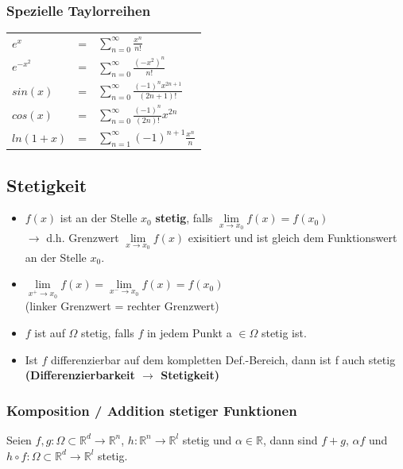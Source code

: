 \documentclass[6pt]{article}
\begin{document}
\begin{multicols*}{3}
\subsubsection*{Spezielle Taylorreihen}
\vspace{-2mm} 
	\begin{doublespace} 
		\begin{tabular}{lll}
			$e^x$  		& = & $\sum_{n=0}^\infty \frac{x^n}{n!}$ \\
			$e^{-x^2}$ & = & $\sum_{n=0}^\infty \frac{(-x^2)^n}{n!}$ \\
			$sin(x)$ 	& = & $\sum_{n=0}^\infty \frac{(-1)^n x^{2n+1}}{(2n+1)!}$\\
			$cos(x)$ 	& = & $\sum_{n=0}^{\infty} \frac{(-1)^n}{(2n)!} x^{2n}$\\
			$ln(1+x)$ & = & $\sum_{n=1}^{\infty} (-1)^{n+1}\frac{x^n}n$ \\
		\end{tabular}
	\end{doublespace}

\pagebreak

\subsection*{Stetigkeit}

\begin{itemize}[itemsep=2pt, parsep=3pt, leftmargin=*,align=left]
	\item 	$f(x)$ ist an der Stelle $x_0$ {\bf stetig}, falls $\lim\limits_{x \to x_0} f(x) = f(x_0)$ \\
				$\rightarrow$ d.h. Grenzwert $\lim\limits_{x \to x_0} f(x)$ exisitiert und ist gleich dem Funktionswert an der Stelle $x_0$.
	\item	$\lim\limits_{x^+ \to x_0} f(x) = \lim\limits_{x^- \to x_0} f(x) = f(x_0)$ \\
		(linker Grenzwert = rechter Grenzwert)
	\item 	$f$ ist auf $\Omega$ stetig, falls $f$ in jedem Punkt a $\in \Omega$ stetig ist.
	\item Ist $f$ differenzierbar auf dem kompletten Def.-Bereich, dann ist f auch  stetig {\bf (Differenzierbarkeit $\rightarrow$ Stetigkeit)}
\end{itemize}

\subsubsection*{Komposition / Addition stetiger Funktionen}
\vspace{-2mm}
Seien $f,g: \Omega \subset \mathbb{R}^d \to \mathbb{R}^n$, $h: \mathbb{R}^n \to \mathbb{R}^l$ stetig und $\alpha \in \mathbb{R}$, dann sind $f+g$, $\alpha f$ und $h \circ f: \Omega \subset \mathbb{R}^d \to \mathbb{R}^l$ stetig.
\vspace{-2mm}


\end{multicols*}
\end{document}
